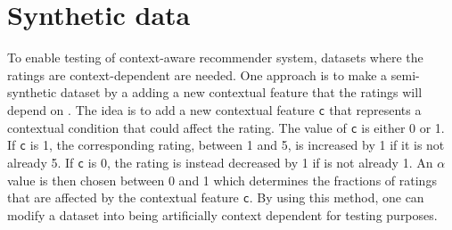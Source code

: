 \section{Synthetic data}
To enable testing of context-aware recommender system, datasets where the ratings are context-dependent are needed.
One approach is to make a semi-synthetic dataset by a adding a new contextual feature that the ratings will depend on \cite{baltrunasContextItemSplit}.
The idea is to add a new contextual feature \texttt{c} that represents a contextual condition that could affect the rating.
The value of \texttt{c} is either 0 or 1. 
If \texttt{c} is 1, the corresponding rating, between 1 and 5, is increased by 1 if it is not already 5.
If \texttt{c} is 0, the rating is instead decreased by 1 if is not already 1.
An $\alpha$ value is then chosen between 0 and 1 which determines the fractions of ratings that are affected by the contextual feature \texttt{c}.
By using this method, one can modify a dataset into being artificially context dependent for testing purposes.